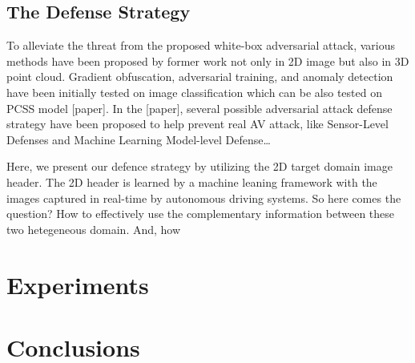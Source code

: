 \documentclass[conference]{IEEEtran}
\begin{document}
\subsection{The Defense Strategy}
To alleviate the threat from the proposed white-box adversarial attack, various methods have been proposed by former work not only in 2D image but also in 3D point cloud. Gradient obfuscation, adversarial training, and anomaly detection have been initially tested on image classification which can be also tested on PCSS model [paper]. In the [paper], several possible adversarial attack defense strategy have been proposed to help prevent real AV attack, like Sensor-Level Defenses and Machine Learning Model-level Defense\ldots

Here, we present our defence strategy by utilizing the 2D target domain image header. The 2D header is learned by a machine leaning framework with the images captured in real-time by autonomous driving systems. So here comes the question? How to effectively use the complementary information between these two hetegeneous domain. And, how  









\section{Experiments}



\section{Conclusions}



\begin{thebibliography}{00}
\end{thebibliography}
\vspace{12pt}
\color{red}
\end{document}

